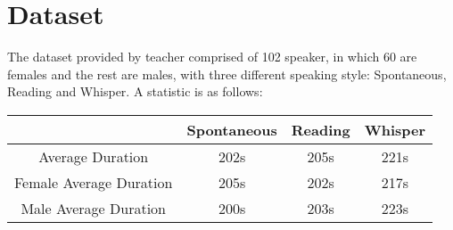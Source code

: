 \section{Dataset}
	The dataset provided by teacher comprised of 102 speaker, in which 60 are
	females and the rest are males, with three different speaking style: Spontaneous,
	Reading and Whisper. A statistic is as follows:
	\begin{table}[!ht]
		\centering
		\begin{tabular}{|c|c|c|c|}
			\hline
			& Spontaneous & Reading & Whisper \\\hline
			Average Duration & 202s & 205s & 221s \\\hline
			Female Average Duration & 205s & 202s & 217s \\\hline
			Male Average Duration & 200s & 203s & 223s \\\hline
		\end{tabular}
	\end{table}
